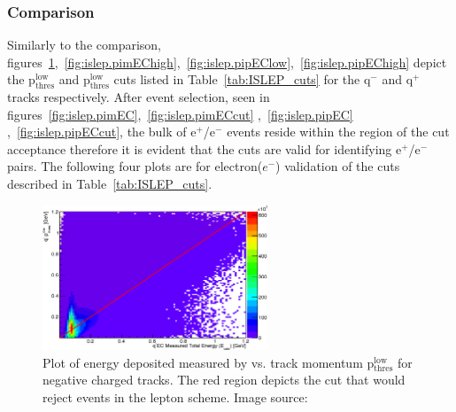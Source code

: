 \FloatBarrier






\subsubsection{\label{sec:data.lepton.ec} Comparison}

Similarly to the  comparison, figures~\ref{fig:islep.pimEClow},~\ref{fig:islep.pimEChigh},~\ref{fig:islep.pipEClow},~\ref{fig:islep.pipEChigh} depict the  p$\mathrm{_{thres}^{low}}$ and  p$\mathrm{_{thres}^{low}}$ cuts listed in  Table~\ref{tab:ISLEP_cuts} for the q$^-$ and q$^+$ tracks respectively. After \π[0] event selection, seen in figures~\ref{fig:islep.pimEC},~\ref{fig:islep.pimECcut} ,~\ref{fig:islep.pipEC} ,~\ref{fig:islep.pipECcut}, the bulk of e$^+$/e$^-$ events reside within the region of the cut acceptance therefore it is evident that the   cuts are valid for identifying e$^+$/e$^-$ pairs. The following four plots are for electron($e^-$)  validation of the   cuts described in Table~\ref{tab:ISLEP_cuts}.
%
\begin{figure}\begin{center}
\includegraphics[width=0.6\textwidth]{figures/lepton/Pim_EClow.eps}
\caption[ Deposited Energy Comparison to Lower Threshold Track Momentum for q$^-$ Tracks]{\label{fig:islep.pimEClow}Plot of energy deposited measured by  vs. track momentum p$\mathrm{_{thres}^{low}}$ for negative charged tracks. The red region depicts the cut that would reject events in the  lepton   scheme. Image source:~\cite{clas.thesis.kunkel}}
\end{center}\end{figure}

